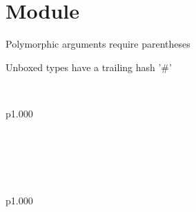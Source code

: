 \section{Module }\label{Oxcaml}%
\label{Oxcaml--val-f}\begin{ocamlindent}Polymorphic arguments require parentheses\end{ocamlindent}%
\medbreak
Unboxed types have a trailing hash '\#'

\label{Oxcaml--type-pt}\\
\begin{ocamltabular}{p{1.000\textwidth}}\label{Oxcaml--type-pt.x}\\
\label{Oxcaml--type-pt.y}\\
\end{ocamltabular}%
\\
\ocamlcodefragment{\}}\\
\label{Oxcaml--type-segment}\\
\begin{ocamltabular}{p{1.000\textwidth}}\label{Oxcaml--type-segment.start}\\
\label{Oxcaml--type-segment.stop}\\
\end{ocamltabular}%
\\
\ocamlcodefragment{\}}\\
